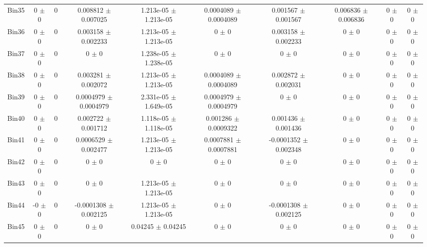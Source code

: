 \begin{tabular}{@{\extracolsep{4pt}}lccccccccc@{}}
     Bin35 & 0 $\pm$ 0 & 0 & 0.008812 $\pm$ 0.007025 & 1.213e-05 $\pm$ 1.213e-05 & 0.0004089 $\pm$ 0.0004089 & 0.001567 $\pm$ 0.001567 & 0.006836 $\pm$ 0.006836 & 0 $\pm$ 0 & 0 $\pm$ 0 \\ 
     Bin36 & 0 $\pm$ 0 & 0 & 0.003158 $\pm$ 0.002233 & 1.213e-05 $\pm$ 1.213e-05 & 0 $\pm$ 0 & 0.003158 $\pm$ 0.002233 & 0 $\pm$ 0 & 0 $\pm$ 0 & 0 $\pm$ 0 \\ 
     Bin37 & 0 $\pm$ 0 & 0 & 0 $\pm$ 0 & 1.238e-05 $\pm$ 1.238e-05 & 0 $\pm$ 0 & 0 $\pm$ 0 & 0 $\pm$ 0 & 0 $\pm$ 0 & 0 $\pm$ 0 \\ 
     Bin38 & 0 $\pm$ 0 & 0 & 0.003281 $\pm$ 0.002072 & 1.213e-05 $\pm$ 1.213e-05 & 0.0004089 $\pm$ 0.0004089 & 0.002872 $\pm$ 0.002031 & 0 $\pm$ 0 & 0 $\pm$ 0 & 0 $\pm$ 0 \\ 
     Bin39 & 0 $\pm$ 0 & 0 & 0.0004979 $\pm$ 0.0004979 & 2.331e-05 $\pm$ 1.649e-05 & 0.0004979 $\pm$ 0.0004979 & 0 $\pm$ 0 & 0 $\pm$ 0 & 0 $\pm$ 0 & 0 $\pm$ 0 \\ 
     Bin40 & 0 $\pm$ 0 & 0 & 0.002722 $\pm$ 0.001712 & 1.118e-05 $\pm$ 1.118e-05 & 0.001286 $\pm$ 0.0009322 & 0.001436 $\pm$ 0.001436 & 0 $\pm$ 0 & 0 $\pm$ 0 & 0 $\pm$ 0 \\ 
     Bin41 & 0 $\pm$ 0 & 0 & 0.0006529 $\pm$ 0.002477 & 1.213e-05 $\pm$ 1.213e-05 & 0.0007881 $\pm$ 0.0007881 & -0.0001352 $\pm$ 0.002348 & 0 $\pm$ 0 & 0 $\pm$ 0 & 0 $\pm$ 0 \\ 
     Bin42 & 0 $\pm$ 0 & 0 & 0 $\pm$ 0 & 0 $\pm$ 0 & 0 $\pm$ 0 & 0 $\pm$ 0 & 0 $\pm$ 0 & 0 $\pm$ 0 & 0 $\pm$ 0 \\ 
     Bin43 & 0 $\pm$ 0 & 0 & 0 $\pm$ 0 & 1.213e-05 $\pm$ 1.213e-05 & 0 $\pm$ 0 & 0 $\pm$ 0 & 0 $\pm$ 0 & 0 $\pm$ 0 & 0 $\pm$ 0 \\ 
     Bin44 & -0 $\pm$ 0 & 0 & -0.0001308 $\pm$ 0.002125 & 1.213e-05 $\pm$ 1.213e-05 & 0 $\pm$ 0 & -0.0001308 $\pm$ 0.002125 & 0 $\pm$ 0 & 0 $\pm$ 0 & 0 $\pm$ 0 \\ 
     Bin45 & 0 $\pm$ 0 & 0 & 0 $\pm$ 0 & 0.04245 $\pm$ 0.04245 & 0 $\pm$ 0 & 0 $\pm$ 0 & 0 $\pm$ 0 & 0 $\pm$ 0 & 0 $\pm$ 0 \\ 
\hline\hline
  \end{tabular}
